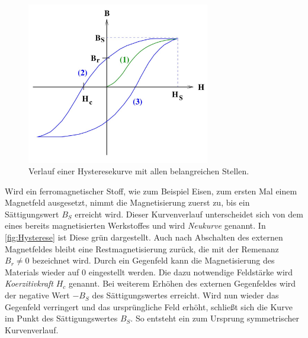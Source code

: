 \begin{figure}
    \centering
    \caption{Verlauf einer Hysteresekurve mit allen belangreichen Stellen. \cite{v308}}
    \label{fig:Hysterese}
    \includegraphics[width=8cm]{content/Hysteresekurve.jpg}
\end{figure}

Wird ein ferromagnetischer Stoff, wie zum Beispiel Eisen, zum ersten Mal einem Magnetfeld ausgesetzt, nimmt die Magnetisierung zuerst zu, bis ein Sättigungswert $B_S$ erreicht wird.
Dieser Kurvenverlauf unterscheidet sich von dem eines bereits magnetisierten Werkstoffes und wird \textit{Neukurve} genannt. In \autoref{fig:Hysterese} ist Diese grün dargestellt. 
Auch nach Abschalten des externen Magnetfeldes bleibt eine Restmagnetisierung zurück, die mit der Remenanz $B_r \neq 0$ bezeichnet wird. Durch ein Gegenfeld kann die
Magnetisierung des Materials wieder auf 0 eingestellt werden. Die dazu notwendige Feldstärke wird \textit{Koerzitivkraft} $H_c$ genannt. Bei weiterem Erhöhen des externen 
Gegenfeldes wird der negative Wert $-B_S$ des Sättigungswertes erreicht. Wird nun wieder das Gegenfeld verringert und das ursprüngliche Feld erhöht, schließt sich die Kurve 
im Punkt des Sättigungswertes $B_S$. So entsteht ein zum Ursprung symmetrischer Kurvenverlauf.
